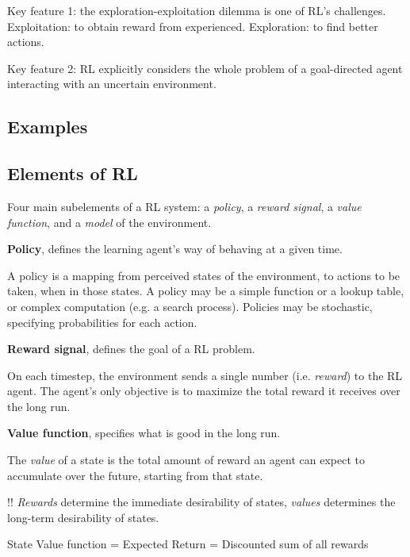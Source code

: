 \documentclass[sutton_barto_notes.tex]{subfiles}
\begin{document}
Key feature 1: the exploration-exploitation dilemma is one of RL's challenges.
Exploitation: to obtain reward from experienced.
Exploration: to find better actions.

Key feature 2: RL explicitly considers the whole problem of a goal-directed agent interacting with an uncertain environment.

\subsection{Examples}
\subsection{Elements of RL}

Four main subelements of a RL system: a \textit{policy}, a \textit{reward signal}, a \textit{value function}, and a \textit{model} of the environment.

\begin{definition}
\textbf{Policy}, defines the learning agent's way of behaving at a given time.
\end{definition}

A policy is a mapping from perceived states of the environment, to actions to be taken, when in those states.
A policy may be a simple function or a lookup table, or complex computation (e.g. a search process).
Policies may be stochastic, specifying probabilities for each action.

\begin{definition}
\textbf{Reward signal}, defines the goal of a RL problem.
\end{definition}

On each timestep, the environment sends a single number (i.e. \textit{reward}) to the RL agent. The agent's only objective is to maximize the total reward it receives over the long run.

\begin{definition}
\textbf{Value function}, specifies what is good in the long run.
\end{definition}

The \textit{value} of a state is the total amount of reward an agent can expect to accumulate over the future, starting from that state.

!! \textit{Rewards} determine the immediate desirability of states, \textit{values} determines the long-term desirability of states.

State Value function = Expected Return = Discounted sum of all rewards
\end{document}
